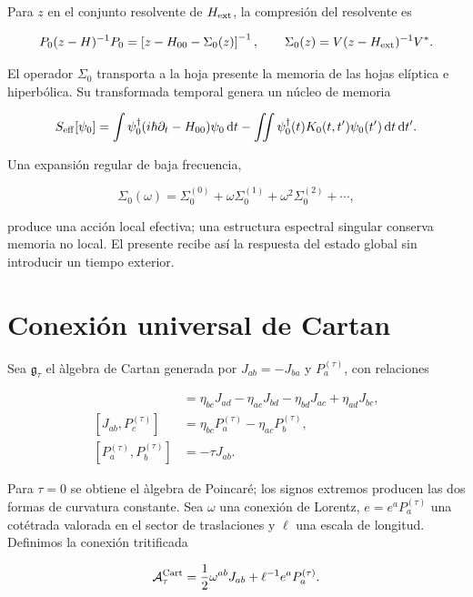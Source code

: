 Para \(z\) en el conjunto resolvente de \(H_{\rm ext}\), la compresi\'on del
resolvente es

\begin{equation}
P_0(z-H)^{-1}P_0
=\left[z-H_{00}-\Sigma_0(z)\right]^{-1},
\qquad
\Sigma_0(z)=V(z-H_{\rm ext})^{-1}V^*.
\label{eq:rm-feshbach-schur}
\end{equation}

El operador \(\Sigma_0\) transporta a la hoja presente la memoria de las hojas
el\'iptica e hiperb\'olica. Su transformada temporal genera un n\'ucleo de
memoria

\[
S_{\rm eff}[\psi_0]
=\int\psi_0^\dagger(i\hbar\partial_t-H_{00})\psi_0\,\mathrm dt
-\iint\psi_0^\dagger(t)K_0(t,t')\psi_0(t')\,\mathrm dt\,\mathrm dt'.
\]

Una expansi\'on regular de baja frecuencia,

\[
\Sigma_0(\omega)
=\Sigma_0^{(0)}+\omega\Sigma_0^{(1)}
+\omega^2\Sigma_0^{(2)}+\cdots,
\]

produce una acci\'on local efectiva; una estructura espectral singular conserva
memoria no local. El presente recibe as\'i la respuesta del estado global sin
introducir un tiempo exterior.

\section{Conexi\'on universal de Cartan}

Sea \(\mathfrak g_\tau\) el \`algebra de Cartan generada por
\(J_{ab}=-J_{ba}\) y \(P_a^{(\tau)}\), con relaciones

\begin{align}
 [J_{ab},J_{cd}]&=
 \eta_{bc}J_{ad}-\eta_{ac}J_{bd}
 -\eta_{bd}J_{ac}+\eta_{ad}J_{bc},\\
 [J_{ab},P_c^{(\tau)}]&=
 \eta_{bc}P_a^{(\tau)}-\eta_{ac}P_b^{(\tau)},\\
 [P_a^{(\tau)},P_b^{(\tau)}]&=-\tau J_{ab}.
 \label{eq:rm-cartan-brackets}
\end{align}

Para \(\tau=0\) se obtiene el \`algebra de Poincar\'e; los signos extremos
producen las dos formas de curvatura constante. Sea \(\omega\) una conexi\'on
de Lorentz, \(e=e^aP_a^{(\tau)}\) una cot\'etrada valorada en el sector de
traslaciones y \(\ell\) una escala de longitud. Definimos la conexi\'on
tritificada

\begin{equation}
\mathcal A_\tau^{\rm Cart}
=\frac12\omega^{ab}J_{ab}+\ell^{-1}e^aP_a^{(\tau)}.
\label{eq:rm-trit-cartan-connection}
\end{equation}

